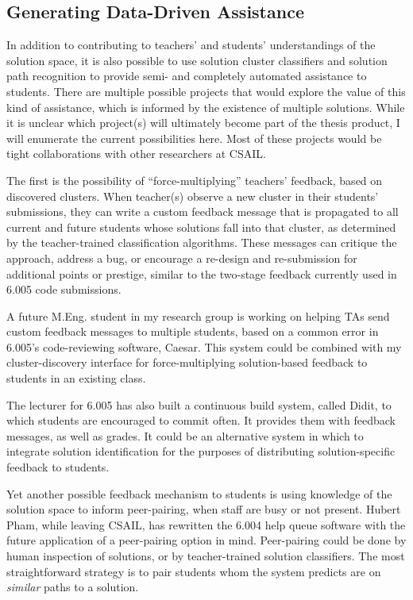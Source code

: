 \documentclass[12pt]{article}
\begin{document}
\subsection{Generating Data-Driven Assistance}

In addition to contributing to teachers' and students' understandings of the solution space, it is also possible to use solution cluster classifiers and solution path recognition to provide semi- and completely automated assistance to students. There are multiple possible projects that would explore the value of this kind of assistance, which is informed by the existence of multiple solutions. While it is unclear which project(s) will ultimately become part of the thesis product, I will enumerate the current possibilities here. Most of these projects would be tight collaborations with other researchers at CSAIL.

The first is the possibility of ``force-multiplying'' \cite{MOOCshop} teachers' feedback, based on discovered clusters. When teacher(s) observe a new cluster in their students' submissions, they can write a custom feedback message that is propagated to all current and future students whose solutions fall into that cluster, as determined by the teacher-trained classification algorithms. These messages can critique the approach, address a bug, or encourage a re-design and re-submission for additional points or prestige, similar to the two-stage feedback currently used in 6.005 code submissions. 

A future M.Eng. student in my research group is working on helping TAs send custom feedback messages to multiple students, based on a common error in 6.005's code-reviewing software, Caesar. This system could be combined with my cluster-discovery interface for force-multiplying solution-based feedback to students in an existing class.

The lecturer for 6.005 has also built a continuous build system, called Didit, to which students are encouraged to commit often. It provides them with feedback messages, as well as grades. It could be an alternative system in which to integrate solution identification for the purposes of distributing solution-specific feedback to students.

Yet another possible feedback mechanism to students is using knowledge of the solution space to inform peer-pairing, when staff are busy or not present. Hubert Pham, while leaving CSAIL, has rewritten the 6.004 help queue software with the future application of a peer-pairing option in mind. Peer-pairing could be done by human inspection of solutions, or by teacher-trained solution classifiers. The most straightforward strategy is to pair students whom the system predicts are on {\em similar} paths to a solution. 
\end{document}
